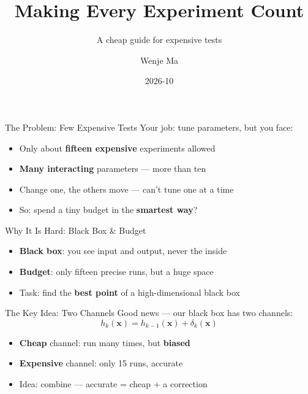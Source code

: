 ﻿\documentclass[10pt]{beamer}
\title{Making Every Experiment Count}
\subtitle{A cheap guide for expensive tests}
\author{Wenje Ma}
\institute{Beijing Institute of Technology}
\date{2026-10}
\begin{document}
\begin{frame}[plain]
  \titlepage
\end{frame}

\begin{frame}{The Problem: Few Expensive Tests}
  Your job: tune parameters, but you face:
  \begin{itemize}
    \item Only about \textbf{fifteen expensive} experiments allowed
    \item \textbf{Many interacting} parameters --- more than ten
    \item Change one, the others move --- can't tune one at a time
    \item So: spend a tiny budget in the \textbf{smartest way}?
  \end{itemize}
\end{frame}

\begin{frame}{Why It Is Hard: Black Box \& Budget}
  \begin{itemize}
    \item \textbf{Black box}: you see input and output, never the inside
    \item \textbf{Budget}: only fifteen precise runs, but a huge space
    \item Task: find the \textbf{best point} of a high-dimensional black box
  \end{itemize}
\end{frame}

\begin{frame}{The Key Idea: Two Channels}
  Good news --- our black box has two channels:
  \begin{equation*}
    h_k(\boldsymbol{x}) = h_{k-1}(\boldsymbol{x}) + \delta_k(\boldsymbol{x})
  \end{equation*}
  \begin{itemize}
    \item \textbf{Cheap} channel: run many times, but \textbf{biased}
    \item \textbf{Expensive} channel: only 15 runs, accurate
    \item Idea: combine --- accurate = cheap + a correction
  \end{itemize}
\end{frame}
\end{document}
